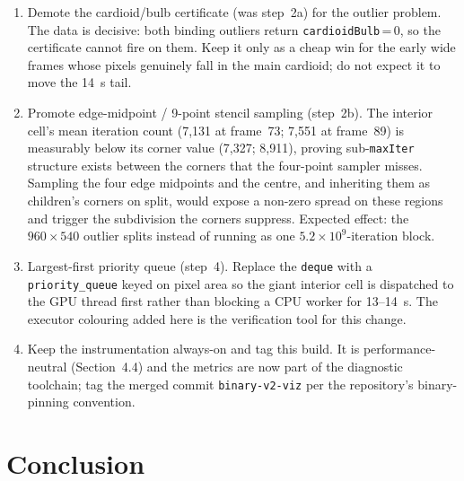 \documentclass[
	english,
	letterpaper, oneside
]{article}
\begin{document}
\begin{enumerate}
    \item Demote the cardioid/bulb certificate (was step~2a) for the
    outlier problem. The data is decisive: both binding outliers return
    \texttt{cardioidBulb}\,=\,0, so the certificate cannot fire on them. Keep it
    only as a cheap win for the early wide frames whose pixels genuinely fall in
    the main cardioid; do not expect it to move the 14~s tail.

    \item Promote edge-midpoint / 9-point stencil sampling (step~2b).
    The interior cell's mean iteration count (7{,}131 at frame~73; 7{,}551 at
    frame~89) is measurably below its corner value (7{,}327; 8{,}911), proving
    sub-\texttt{maxIter} structure exists between the corners that the four-point
    sampler misses. Sampling the four edge midpoints and the centre, and
    inheriting them as children's corners on split, would expose a non-zero
    spread on these regions and trigger the subdivision the corners suppress.
    Expected effect: the $960\times540$ outlier splits instead of running as one
    $5.2\times10^9$-iteration block.

    \item Largest-first priority queue (step~4). Replace the
    \texttt{deque} with a \texttt{priority\_queue} keyed on pixel area so the
    giant interior cell is dispatched to the GPU thread first rather than
    blocking a CPU worker for 13--14~s. The executor colouring added here is the
    verification tool for this change.

    \item Keep the instrumentation always-on and tag this build. It is
    performance-neutral (Section~4.4) and the metrics are now part of the
    diagnostic toolchain; tag the merged commit \texttt{binary-v2-viz} per the
    repository's binary-pinning convention.
\end{enumerate}

\section{Conclusion}
\end{document}
